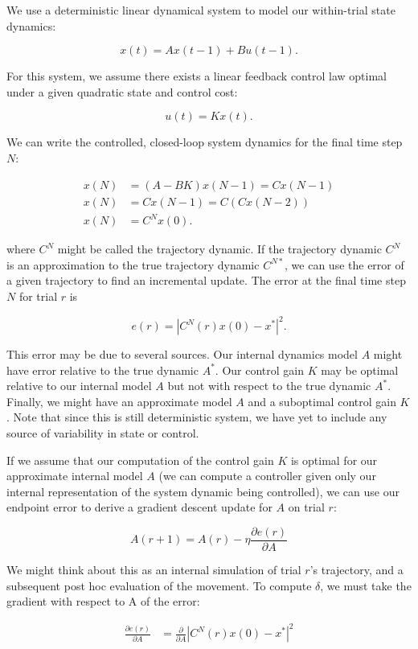 \documentclass[
  a4paper,
]{article}
\begin{document}
We use a deterministic linear dynamical system to model our within-trial
state dynamics:

\[
x(t) = Ax(t-1) + Bu(t-1).
\]

For this system, we assume there exists a linear feedback control law
optimal under a given quadratic state and control cost:

\[
u(t) = Kx(t).
\]

We can write the controlled, closed-loop system dynamics for the final
time step \(N\):

\[
\begin{aligned} 
x(N) &= (A - BK)x(N-1) = Cx(N-1) \\
x(N) &= Cx(N-1) = C(Cx(N-2)) \\
x(N) &= C^Nx(0).
\end{aligned} 
\]

where \(C^N\) might be called the trajectory dynamic. If the trajectory
dynamic \(C^N\) is an approximation to the true trajectory dynamic
\(C^{N*}\), we can use the error of a given trajectory to find an
incremental update. The error at the final time step \(N\) for trial
\(r\) is

\[
e(r) = |C^N(r)x(0) - x^*|^2.
\]

This error may be due to several sources. Our internal dynamics model
\(A\) might have error relative to the true dynamic \(A^*\). Our control
gain \(K\) may be optimal relative to our internal model \(A\) but not
with respect to the true dynamic \(A^*\). Finally, we might have an
approximate model \(A\) and a suboptimal control gain \(K\). Note that
since this is still deterministic system, we have yet to include any
source of variability in state or control.

If we assume that our computation of the control gain \(K\) is optimal
for our approximate internal model \(A\) (we can compute a controller
given only our internal representation of the system dynamic being
controlled), we can use our endpoint error to derive a gradient descent
update for \(A\) on trial \(r\):

\[
A(r+1) = A(r) - \eta\frac{\partial{e(r)}}{\partial{A}}
\]

We might think about this as an internal simulation of trial \(r\)'s
trajectory, and a subsequent post hoc evaluation of the movement. To
compute \(\delta\), we must take the gradient with respect to A of the
error:

\[
\begin{aligned}
\frac{\partial{e(r)}}{\partial{A}} &= \frac{\partial{}}{\partial{A}}{|C^N(r)x(0) - x^*|^2}
\end{aligned}
\]
\end{document}
